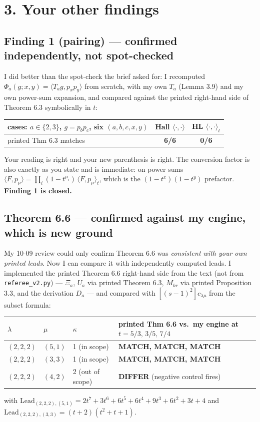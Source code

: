 \documentclass[11pt]{article}
\begin{document}
\section*{3. Your other findings}

\subsection*{Finding 1 (pairing) --- confirmed independently, not spot-checked}

I did better than the spot-check the brief asked for: I recomputed
$\Phi_a(g;x,y)=\langle T_ag,p_xp_y\rangle$ from scratch, with my own $T_a$ (Lemma 3.9) and my own
power-sum expansion, and compared against the printed right-hand side of Theorem 6.3 symbolically
in $t$:

\begin{center}
\begin{tabular}{lcc}
\toprule
cases: $a\in\{2,3\}$, $g=p_bp_c$, six $(a,b,c,x,y)$ & Hall $\langle\cdot,\cdot\rangle$
 & HL $\langle\cdot,\cdot\rangle_t$ \\
\midrule
printed Thm 6.3 matches & \textbf{6/6} & \textbf{0/6} \\
\bottomrule
\end{tabular}
\end{center}

Your reading is right and your new parenthesis is right. The conversion factor is also exactly as
you state and is immediate: on power sums
$\langle F,p_\mu\rangle=\prod_i(1-t^{\mu_i})\,\langle F,p_\mu\rangle_t$, which is the
$(1-t^x)(1-t^y)$ prefactor. \textbf{Finding 1 is closed.}

\subsection*{Theorem 6.6 --- confirmed against my engine, which is new ground}

My 10-09 review could only confirm Theorem 6.6 was \emph{consistent with your own printed leads}.
Now I can compare it with independently computed leads. I implemented the printed Theorem 6.6
right-hand side from the text (not from \texttt{referee\_v2.py}) --- $\Xi_a$, $U_a$ via printed
Theorem 6.3, $M_{kr}$ via printed Proposition 3.3, and the derivation $D_a$ --- and compared with
$[(s-1)^2]c_{\lambda\mu}$ from the subset formula:

\begin{center}
\begin{tabular}{llll}
\toprule
$\lambda$ & $\mu$ & $\kappa$ & printed Thm 6.6 vs.\ my engine at $t=5/3,\,3/5,\,7/4$\\
\midrule
$(2,2,2)$ & $(5,1)$ & 1 (in scope)  & \textbf{MATCH, MATCH, MATCH} \\
$(2,2,2)$ & $(3,3)$ & 1 (in scope)  & \textbf{MATCH, MATCH, MATCH} \\
$(2,2,2)$ & $(4,2)$ & 2 (out of scope) & \textbf{DIFFER} (negative control fires) \\
\bottomrule
\end{tabular}
\end{center}
with $\mathrm{Lead}_{(2,2,2),(5,1)}=2t^7+3t^6+6t^5+6t^4+9t^3+6t^2+3t+4$ and
$\mathrm{Lead}_{(2,2,2),(3,3)}=(t+2)(t^2+t+1)$.
\end{document}
